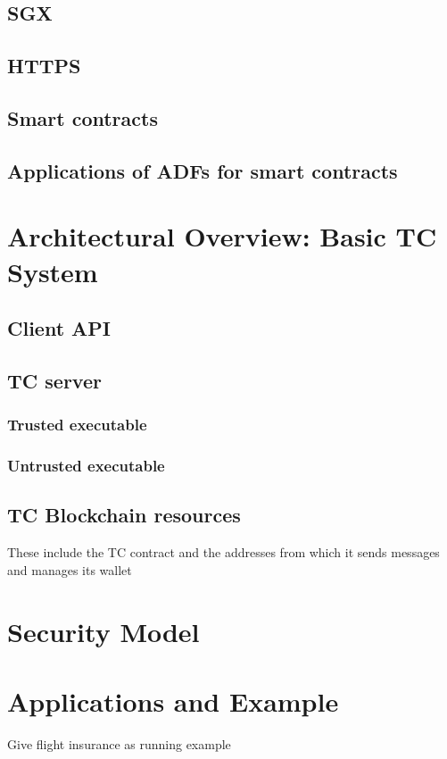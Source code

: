 \documentclass[letterpaper,twocolumn,10pt]{article}
\begin{document}
\subsection{SGX}
\subsection{HTTPS}
\subsection{Smart contracts}
\subsection{Applications of ADFs for smart contracts}

\section{Architectural Overview: Basic TC System}
\subsection{Client API}
\subsection{TC server}
\subsubsection{Trusted executable}
\subsubsection{Untrusted executable}
\subsection{TC Blockchain resources}
These include the TC contract and the addresses from which it sends messages and manages its wallet

\section{Security Model}

\section{Applications and Example}

Give flight insurance as running example
\end{document}

